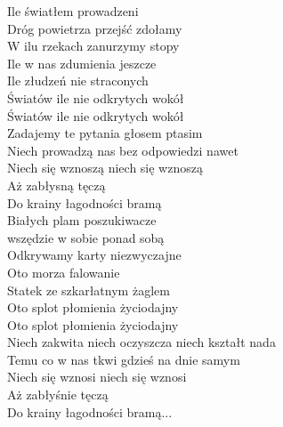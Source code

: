 
\begin{flushleft}
Ile światłem prowadzeni \\
Dróg powietrza przejść zdołamy \\
W ilu rzekach zanurzymy stopy \\
\vskip 3mm
Ile w nas zdumienia jeszcze \\
Ile złudzeń nie straconych \\
Światów ile nie odkrytych wokół \\
Światów ile nie odkrytych wokół \\
\vskip 3mm
\hspace{0.9cm}Zadajemy te pytania głosem ptasim \\
\hspace{0.9cm}Niech prowadzą nas bez odpowiedzi nawet \\
\hspace{0.9cm}Niech się wznoszą niech się wznoszą \\
\hspace{0.9cm}Aż zabłysną tęczą \\
\hspace{0.9cm}Do krainy łagodności bramą \\
\vskip 3mm
Białych plam poszukiwacze \\
wszędzie w sobie ponad sobą \\
Odkrywamy karty niezwyczajne \\
\vskip 3mm
Oto morza falowanie \\
Statek ze szkarłatnym żaglem \\
Oto splot płomienia życiodajny \\
Oto splot płomienia życiodajny \\
\vskip 3mm
\hspace{0.9cm}Niech zakwita niech oczyszcza niech kształt nada \\
\hspace{0.9cm}Temu co w nas tkwi gdzieś na dnie samym \\
\hspace{0.9cm}Niech się wznosi niech się wznosi \\
\hspace{0.9cm}Aż zabłyśnie tęczą \\
\hspace{0.9cm}Do krainy łagodności bramą... \\
\end{flushleft}
\clearpage

